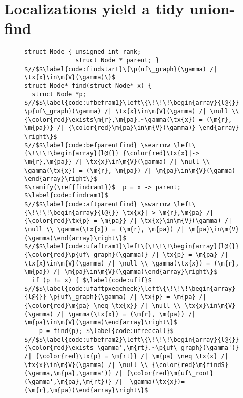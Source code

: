 \documentclass[acmsmall,review,anonymous]{acmart}\settopmatter{printfolios=true,printccs=false,printacmref=false}
\newcommand{\tx}[1]{\text{#1}}
\newcommand{\p}[1]{\ensuremath{\mathsf{#1}}} \newcommand{\m}[1]{\ensuremath{\mathit{#1}}} \newcommand{\ma}[1]{\ensuremath{\mathcal{#1}}} \let\ramify\lightning
\begin{document}
\section{Localizations yield a tidy union-find}
\label{sec:orientation}
\begin{figure}[t]
\vspace{-1ex}
  \begin{lstlisting}[multicols=2]
struct Node { unsigned int rank; 
              struct Node * parent; }
$//$$\label{code:findstart}\{\p{uf\_graph}(\gamma) /| \tx{x}\in\m{V}(\gamma)\}$
struct Node* find(struct Node* x) {
  struct Node *p;
$//$$\label{code:ufbefram1}\left\{\!\!\!\begin{array}{l@{}} \p{uf\_graph}(\gamma) /| \tx{x}\in\m{V}(\gamma) /| \null \\ {\color{red}\exists\m{r},\m{pa}.~\gamma(\tx{x}) = (\m{r}, \m{pa})} /| {\color{red}\m{pa}\in\m{V}(\gamma)} \end{array} \right\}$
$//$$\label{code:befparentfind} \searrow \left\{\!\!\!\begin{array}{l@{}} {\color{red}\tx{x}|-> \m{r},\m{pa}} /| \tx{x}\in\m{V}(\gamma) /| \null \\ \gamma(\tx{x}) = (\m{r}, \m{pa}) /| \m{pa}\in\m{V}(\gamma) \end{array}\right\}$
$\ramify(\ref{findram1})$  p = x -> parent; $\label{code:findram1}$
$//$$\label{code:aftparentfind} \swarrow \left\{\!\!\!\begin{array}{l@{}} \tx{x}|-> \m{r},\m{pa} /| {\color{red}\tx{p} = \m{pa}} /| \tx{x}\in\m{V}(\gamma) /| \null \\ \gamma(\tx{x}) = (\m{r}, \m{pa}) /| \m{pa}\in\m{V}(\gamma)\end{array}\right\}$
$//$$\label{code:ufaftram1}\left\{\!\!\!\begin{array}{l@{}} {\color{red}\p{uf\_graph}(\gamma)} /| \tx{p} = \m{pa} /| \tx{x}\in\m{V}(\gamma) /| \null \\ \gamma(\tx{x}) = (\m{r}, \m{pa}) /| \m{pa}\in\m{V}(\gamma)\end{array}\right\}$
  if (p != x) { $\label{code:ufif}$
$//$$\label{code:ufaftpxeqcheck}\left\{\!\!\!\begin{array}{l@{}} \p{uf\_graph}(\gamma) /| \tx{p} = \m{pa} /| {\color{red}\m{pa} \neq \tx{x}} /| \null \\ \tx{x}\in\m{V}(\gamma) /| \gamma(\tx{x}) = (\m{r}, \m{pa}) /| \m{pa}\in\m{V}(\gamma)\end{array}\right\}$
    p = find(p); $\label{code:ufreccall}$
$//$$\label{code:ufbefram2}\left\{\!\!\!\begin{array}{l@{}}{\color{red}\exists \gamma',\m{rt}.~\p{uf\_graph}(\gamma')} /| {\color{red}\tx{p} = \m{rt}} /| \m{pa} \neq \tx{x} /| \tx{x}\in\m{V}(\gamma) /| \null \\ {\color{red}\m{findS}(\gamma,\m{pa},\gamma')} /| {\color{red}\m{uf\_root}(\gamma',\m{pa},\m{rt})} /|  \gamma(\tx{x})=(\m{r},\m{pa})\end{array}\right\}$

\end{lstlisting}
\end{figure}
\end{document}
